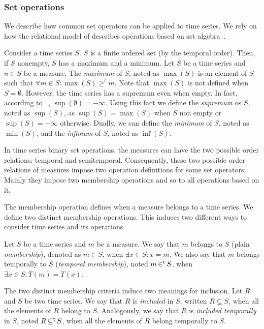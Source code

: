 \subsubsection{Set operations}

We describe how common set operators can be applied to time series. We
rely on how the relational model of  describes operations
based on set algebra~\cite{date:introduction}.


Consider a time series $S$. $S$ is a finite ordered set (by the
temporal order). Then, if $S$ nonempty, $S$ has a maximum and a
minimum.  
%
Let $S$ be a time series and $n\in S$ be a measure. The \emph{maximum}
of $S$, noted as $\max(S)$ is an element of $S$ such that $\forall m
\in S:\max(S)\geq^t m $.  
%
Note that $\max(S)$ is not defined when $S=\emptyset$. However, the
time series has a supremum even when empty. In fact, according to~
\cite{cantrell:extendedreal}, $\sup(\emptyset)=-\infty$.
%
Using this fact we define the \emph{supremum} os $S$, noted as
$\sup(S)$, as $\sup(S)=\max(S)$ when $S$ non empty or
$\sup(S)=-\infty$ otherwise.
%
Dually, we can define the \emph{minimum} of $S$, noted as $\min(S)$,
and the \emph{infimum} of $S$, noted as $\inf(S)$.

In time series binary set operations, the measures can have the two
possible order relations: temporal and semitemporal. Consequently,
these two possible order relations of measures impose two operation
definitions for some set operators.  Mainly they impose two membership
operations and so to all operations based on it.

The membership operation defines when a measure belongs to a time
series. We define two distinct membership operations. This induces two
different ways to consider time series and its operations.


Let $S$ be a time series and $m$ be a measure. 
%
We say that $m$ belongs to $S$ (plain \emph{membership}), denoted as
$m \in S$, when $\exists x\in S: x=m$.  We also say that $m$ belongs
temporally to $S$ (\emph{temporal membership}), noted $m \operatorname*{\in^t} S$,
when $\exists x\in S : T(m)=T(x)$.


The two distinct membership criteria induce two meanings for
inclusion. Let $R$ and $S$ be two time series.  We say that $R$ is
\emph{included} in $S$, written $R\subseteq S$, when all the elements
of $R$ belong to $S$.  Analogously, we say that $R$ is \emph{included
  temporally} in $S$, noted $R\operatorname*{\subseteq^t} S$, when all the elements of
$R$ belong temporally to $S$.


